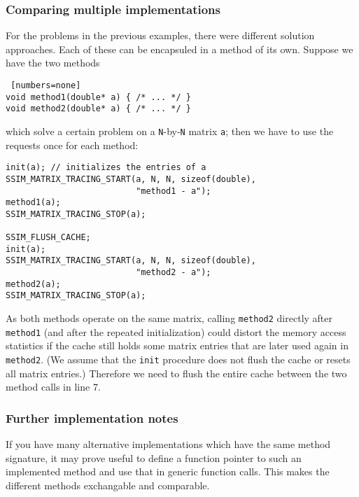 \subsubsection*{Comparing multiple implementations}
For the problems in the previous examples, there were different solution approaches. Each of these can be encapsuled in a method of its own. Suppose we have the two methods
\begin{lstlisting} [numbers=none]
void method1(double* a) { /* ... */ }
void method2(double* a) { /* ... */ }
\end{lstlisting}
which solve a certain problem on a \texttt{N}-by-\texttt{N} matrix \texttt{a}; then we have to use the requests once for each method:
\begin{lstlisting}
init(a); // initializes the entries of a
SSIM_MATRIX_TRACING_START(a, N, N, sizeof(double), 
                          "method1 - a");
method1(a);
SSIM_MATRIX_TRACING_STOP(a);

SSIM_FLUSH_CACHE;
init(a);
SSIM_MATRIX_TRACING_START(a, N, N, sizeof(double), 
                          "method2 - a");
method2(a);
SSIM_MATRIX_TRACING_STOP(a);
\end{lstlisting}
As both methods operate on the same matrix, calling \texttt{method2} directly after \texttt{method1} (and after the repeated initialization) could distort the memory access statistics if the cache still holds some matrix entries that are later used again in \texttt{method2}. (We assume that the \texttt{init} procedure does not flush the cache or resets all matrix entries.) Therefore we need to flush the entire cache between the two method calls in line 7. %

\subsubsection*{Further implementation notes}
If you have many alternative implementations which have the same method signature, it may prove useful to define a function pointer to such an implemented method and use that in generic function calls. This makes the different methods exchangable and comparable.

